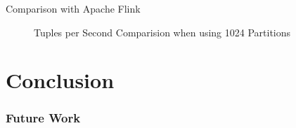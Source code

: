 \begin{frame}{Comparison with Apache Flink}
  \begin{figure}[h]
    \centering
    \resizebox{.7\linewidth}{!}{}
    \caption[Tuples per Second Comparison Plot with Apache Flink]{Tuples per Second Comparision when using 1024 Partitions}
    \label{plot-apache-flink-comparison}
  \end{figure}
\end{frame}

\section{Conclusion}
\begin{frame}
  \frametitle{Future Work}
\end{frame}

